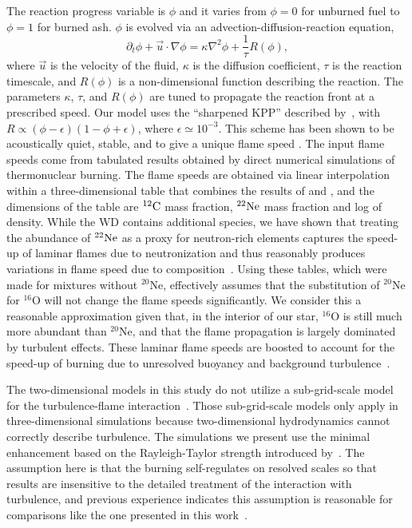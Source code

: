 \documentclass[preprint2]{aastex63}
\newcommand{\C}[1]{\ensuremath{{}^{#1}{\rm C}}}
\newcommand{\Ne}[1]{\ensuremath{{}^{#1}{\rm Ne}}}
\newcommand{\pv}{\ensuremath{\phi}}
\begin{document}
The reaction progress variable is $\phi$ and it varies from $\phi=0$ for
unburned fuel to $\phi=1$ for burned ash. $\phi$ is evolved
via an advection-diffusion-reaction equation,
\begin{equation}
  \label{eq:ard}
  \partial_t \pv + \vec{u}\cdot\nabla \pv = \kappa \nabla^2 \pv +
\frac{1}{\tau} R\left(\phi\right) ,
\end{equation}
where $\vec{u}$ is the velocity of the fluid, $\kappa$ is the
diffusion coefficient, $\tau$ is the reaction timescale, and $R(\phi)$ is
a non-dimensional function describing the reaction. The parameters
$\kappa$, $\tau$, and $R(\phi)$ are tuned to propagate the reaction
front at a prescribed speed.  Our model uses the ``sharpened KPP''
 described by~\cite{VladWeirRyzh06},
with $R\propto(\phi-\epsilon)(1-\phi+\epsilon)$, where
$\epsilon \simeq 10^{-3}$.  This scheme has been shown to be
acoustically quiet, stable, and to give a unique flame speed
\citep{townsley.calder.ea:flame}. The input flame speeds come from
tabulated results obtained by direct numerical simulations of
thermonuclear burning.
{\color{blue}
The flame speeds are obtained via linear interpolation within a 
three-dimensional table that combines the results of \citet{timmes92} 
and \citet{Chametal08}, and the dimensions of the table are \C{12} 
mass fraction, \Ne{22} mass fraction and log of density. While the
WD contains additional species, we have shown that treating the
abundance of \Ne{22} as a proxy for neutron-rich elements captures the
speed-up of laminar flames due to neutronization and thus reasonably 
produces variations in flame speed due to composition~\citep{jacketal2010}.}
{\color{blue} Using these tables, which were made for mixtures without $^{20}$Ne,
effectively assumes that the substitution of $^{20}$Ne for $^{16}$O will not
change the flame speeds significantly.  We consider this a reasonable
approximation given that, in the interior of our star, $^{16}$O is still much
more abundant than $^{20}$Ne, and that the flame propagation is largely
dominated by turbulent effects.}
These laminar flame speeds are boosted to account for the speed-up 
of burning due to unresolved buoyancy and background turbulence~\citep{Khok95,
gamezo.khokhlov.ea:thermonuclear,townsley.calder.ea:flame,jacketal2014}.

The two-dimensional models in this study do not utilize a sub-grid-scale
model for the turbulence-flame
interaction~\citep[See][for examples]{Schmetal06a,Schmetal06b,jacketal2014}.
Those sub-grid-scale models only apply in three-dimensional
simulations because two-dimensional hydrodynamics cannot
correctly describe turbulence. The simulations we present
use the minimal enhancement based on the Rayleigh-Taylor
strength introduced by~\citet{townsley.calder.ea:flame}. The
assumption here is that the burning self-regulates on resolved
scales so that results are insensitive to the detailed treatment
of the interaction with turbulence, and previous experience
indicates this assumption is reasonable for comparisons
like the one presented in this work~\citep{townsley.calder.ea:flame,
willcoxetal2016}.
\end{document}
